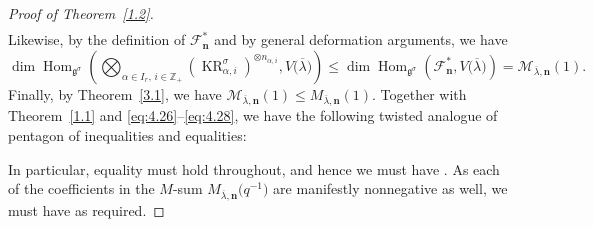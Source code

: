 \documentclass[10pt,a4paper]{amsart}
\numberwithin{equation}{section}
\DeclareMathOperator{\KR}{KR}
\DeclareMathOperator{\Hom}{Hom}
\begin{document}
\begin{proof}[Proof of Theorem~\ref{1.2}]
\begin{gather}
\end{gather}
Likewise, by the definition of $\mathcal{F}_{\mathbf{n}}^*$ and by general deformation arguments, we have
\begin{equation}\label{eq:4.28}
\dim\Hom_{\mathfrak{g}^{\sigma}}\left(\bigotimes_{\alpha\in I_r,\,i\in\mathbb{Z}_+}(\KR_{\alpha,i}^{\sigma})^{\otimes n_{\alpha,i}},V\bigl(\overline{\lambda}\bigr)\right)
\leq\dim\Hom_{\mathfrak{g}^{\sigma}}(\mathcal{F}_{ \mathbf{n}}^*,V\bigl(\overline{\lambda}\bigr))=\mathcal{M}_{\overline{\lambda},\mathbf{n}}(1).
\end{equation}
Finally, by Theorem~\ref{3.1}, we have $\mathcal{M}_{ \overline{\lambda},\mathbf{n}}(1)\leq M_{\overline{\lambda}, \mathbf{n}}(1)$. Together with Theorem~\ref{1.1} and \eqref{eq:4.26}--\eqref{eq:4.28}, we have the following twisted analogue of pentagon of inequalities and equalities:
\begin{center}
\end{center}
In particular, equality must hold throughout, and hence we must have . As each of the coefficients in the $M$-sum $M_{\overline{ \lambda},\mathbf{n}}\bigl(q^{-1}\bigr)$ are manifestly nonnegative as well, we must have  as required.
\end{proof}
\end{document}
